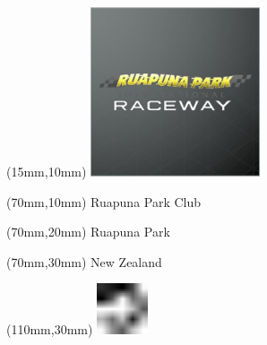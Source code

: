 \null\newpage
\begin{textblock*}{50mm}(15mm,10mm)%
\includegraphics[width=50mm]{LG/RUPU.png}
\end{textblock*}
\begin{textblock*}{130mm}(70mm,10mm)%
{\fontsize{20}{20}\selectfont Ruapuna Park Club}\\
\end{textblock*}
\begin{textblock*}{120mm}(70mm,20mm)%
{\fontsize{16}{16}\selectfont Ruapuna Park}\\
\end{textblock*}
\begin{textblock*}{120mm}(70mm,30mm)%
{\fontsize{12}{12}\selectfont New Zealand}
\end{textblock*}
\begin{textblock*}{30mm}(110mm,30mm)%
\centering
\includegraphics[height=15mm]{icons/fa-rotate-left.pdf}
\end{textblock*}

